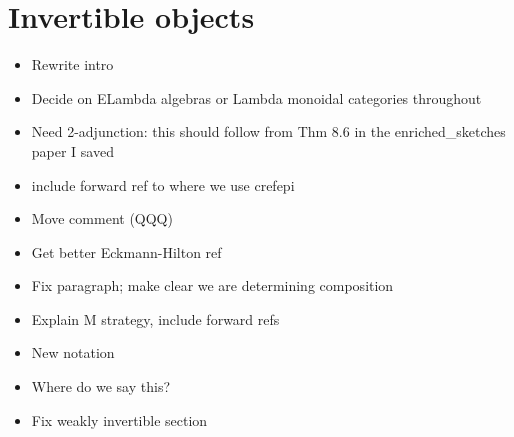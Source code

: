 \documentclass{amsart}
\begin{document}
\section{ Invertible objects}
\begin{itemize}
\item Rewrite intro
\item Decide on ELambda algebras or Lambda monoidal categories throughout
\item Need 2-adjunction: this should follow from Thm 8.6 in the enriched\_sketches paper I saved
\item include forward ref to where we use cref{epi}



\item Move comment (QQQ)
\item Get better Eckmann-Hilton ref



\item Fix paragraph; make clear we are determining composition
\item Explain M strategy, include forward refs



\item New notation
\item Where do we say this?
\item Fix weakly invertible section
\end{itemize}
\end{document}
